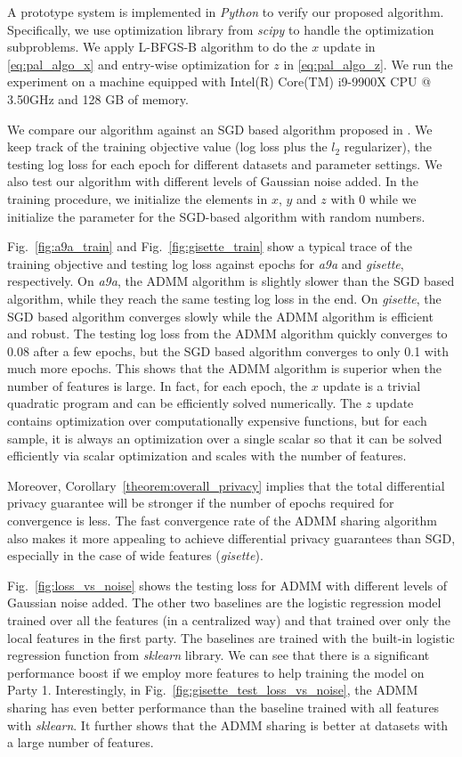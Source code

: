 A prototype system is implemented in \emph{Python} to verify our proposed algorithm. Specifically, we use optimization library from \emph{scipy} to handle the optimization subproblems. We apply L-BFGS-B algorithm to do the $x$ update in \eqref{eq:pal_algo_x} and entry-wise optimization for $z$ in \eqref{eq:pal_algo_z}. We run the experiment on a machine equipped with Intel(R) Core(TM) i9-9900X CPU @ 3.50GHz and 128 GB of memory. 

We compare our algorithm against an SGD based algorithm proposed in \cite{hu2019fdml}.
We keep track of the training objective value (log loss plus the $l_2$ regularizer), the testing log loss for each epoch for different datasets and parameter settings. We also test our algorithm with different levels of Gaussian noise added. In the training procedure, we initialize the elements in $x$, $y$ and $z$ with $0$ while we initialize the parameter for the SGD-based algorithm with random numbers.

Fig.~\ref{fig:a9a_train} and Fig.~\ref{fig:gisette_train} show a typical trace of the training objective and testing log loss against epochs for \emph{a9a} and \emph{gisette}, respectively. On \emph{a9a}, the ADMM algorithm is slightly slower than the SGD based algorithm, while they reach the same testing log loss in the end. On \emph{gisette}, the SGD based algorithm converges slowly while the ADMM algorithm is efficient and robust. The testing log loss from the ADMM algorithm quickly converges to 0.08 after a few epochs, but the SGD based algorithm converges to only 0.1 with much more epochs. This shows that the ADMM algorithm is superior when the number of features is large.
In fact, for each epoch, the $x$ update is a trivial quadratic program and can be efficiently solved numerically. The $z$ update contains optimization over computationally expensive functions, but for each sample, it is always an optimization over a single scalar so that it can be solved efficiently via scalar optimization and scales with the number of features. 

Moreover, Corollary~\ref{theorem:overall_privacy} implies that the total differential privacy guarantee will be stronger if the number of epochs required for convergence is less. The fast convergence rate of the ADMM sharing algorithm also makes it more appealing to achieve differential privacy guarantees than SGD, especially in the case of wide features (\emph{gisette}).

Fig.~\ref{fig:loss_vs_noise} shows the testing loss for ADMM with different levels of Gaussian noise added. The other two baselines are the logistic regression model trained over all the features (in a centralized way) and that trained over only the local features in the first party. The baselines are trained with the built-in logistic regression function from \emph{sklearn} library. We can see that there is a significant performance boost if we employ more features to help training the model on Party 1. Interestingly, in Fig.~\ref{fig:gisette_test_loss_vs_noise}, the ADMM sharing has even better performance than the baseline trained with all features with \emph{sklearn}. It further shows that the ADMM sharing is better at datasets with a large number of features. 


